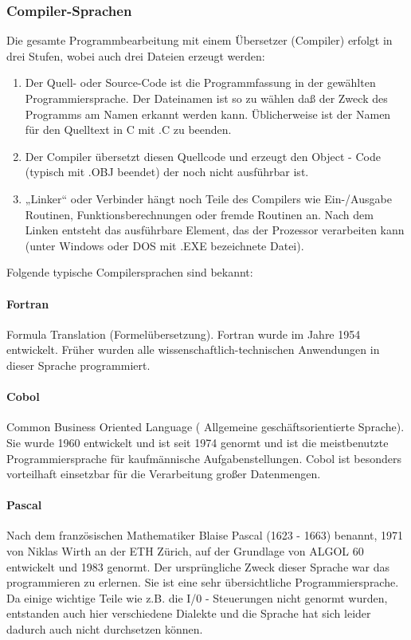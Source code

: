 \subsubsection{Compiler-Sprachen}
Die gesamte Programmbearbeitung mit einem Übersetzer (Compiler) erfolgt in drei Stufen, wobei auch drei Dateien erzeugt werden:
\begin{enumerate}
	\item Der Quell- oder Source-Code ist die Programmfassung in der gewählten Programmiersprache. Der Dateinamen ist so zu wählen daß der Zweck des Programms am Namen erkannt werden kann. Üblicherweise ist der Namen für den Quelltext in C mit .C zu beenden. 
	\item Der Compiler übersetzt diesen Quellcode und erzeugt den Object - Code (typisch mit .OBJ beendet) der noch nicht ausführbar ist.
	\item „Linker“ oder Verbinder hängt noch Teile des Compilers wie Ein-/Ausgabe Routinen, Funktionsberechnungen oder fremde Routinen an. Nach dem Linken entsteht das ausführbare Element, das der Prozessor verarbeiten kann (unter Windows oder DOS mit .EXE bezeichnete Datei).
\end{enumerate}

	
Folgende typische Compilersprachen sind bekannt:

\paragraph{Fortran}
Formula Translation (Formelübersetzung). Fortran wurde im Jahre 1954 entwickelt. Früher wurden alle wissenschaftlich-technischen Anwendungen in dieser Sprache programmiert.

\paragraph{Cobol}
Common Business Oriented Language ( Allgemeine geschäftsorientierte Sprache). Sie wurde 1960 entwickelt und ist seit 1974 genormt und ist die meistbenutzte Programmiersprache für kaufmännische Aufgabenstellungen. Cobol ist besonders vorteilhaft einsetzbar für die Verarbeitung großer Datenmengen.

\paragraph{Pascal}
Nach dem französischen Mathematiker Blaise Pascal (1623 - 1663) benannt, 1971 von Niklas Wirth an der ETH Zürich, auf der Grundlage von ALGOL 60 entwickelt und 1983 genormt. Der ursprüngliche Zweck dieser Sprache war das programmieren zu erlernen. Sie ist eine sehr übersichtliche Programmiersprache. Da einige wichtige Teile wie z.B. die I/0 - Steuerungen nicht genormt wurden, entstanden auch hier verschiedene Dialekte und die Sprache hat sich leider dadurch auch nicht durchsetzen können.

